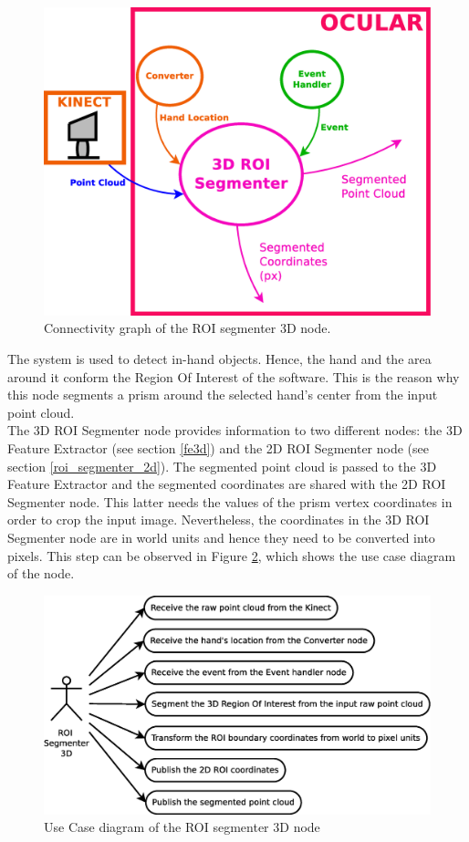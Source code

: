 		\begin{figure}[H]
			\begin{center}
			\includegraphics[width=0.5\linewidth]{img/diagrams/node_roi3d.eps}
			\caption[ROI segmenter 3D node I/O]{Connectivity graph of the ROI segmenter 3D node.}		
			\label{node_roi3d}
			\end{center}
		\end{figure}


	The system is used to detect in-hand objects. 
	Hence, the hand and the area around it conform the Region Of Interest of the software. 
	This is the reason why this node segments a prism around the selected hand's center from the input point cloud.
	\\

	The 3D ROI Segmenter node provides information to two different nodes: the 3D Feature Extractor (see section \ref{fe3d}) and the 2D ROI Segmenter node (see section \ref{roi_segmenter_2d}). 
	The segmented point cloud is passed to the 3D Feature Extractor and the segmented coordinates are shared with the 2D ROI Segmenter node. 
	This latter needs the values of the prism vertex coordinates in order to crop the input image. 
	Nevertheless, the coordinates in the 3D ROI Segmenter node are in world units and hence they need to be converted into pixels. 
	This step can be observed in Figure \ref{uc_roi3d}, which shows the use case diagram of the node. 
	

	\begin{figure}[H]
		\centering
	\includegraphics[scale=0.4]{img/diagrams/uc_roi_segmenter_3d.eps}
		\caption[Use case diagram ROI segmenter 3D node]{Use Case diagram of the ROI segmenter 3D node}
		\label{uc_roi3d}	
	\end{figure}
 
